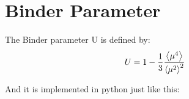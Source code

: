 \section{Binder Parameter}

The Binder parameter U is defined by:
\begin{align}
	U
		&=1-\frac{1}{3}\frac{\left\langle\mu^4\right\rangle}{\left\langle\mu^2\right\rangle^2}
		\label{fbinder}
\end{align}

And it is implemented in python just like this:
